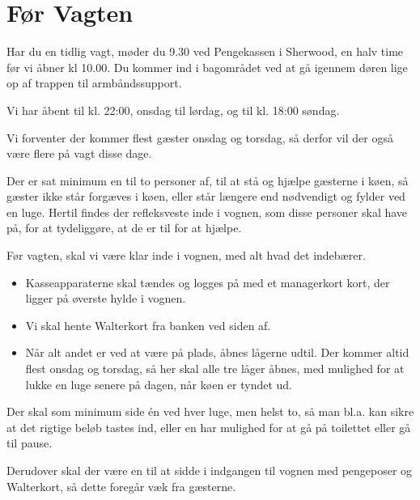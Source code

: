 \section{Før Vagten}
\label{sec:pre-vagten}

Har du en tidlig vagt, møder du 9.30 ved Pengekassen i Sherwood, en halv time før vi åbner kl 10.00.
Du kommer ind i bagområdet ved at gå igennem døren lige op af trappen til armbåndssupport.

Vi har åbent til kl. 22:00, onsdag til lørdag, og til kl. 18:00 søndag.

Vi forventer der kommer flest gæster onsdag og torsdag, 
så derfor vil der også være flere på vagt disse dage.

Der er sat minimum en til to personer af, til at stå og hjælpe gæsterne i køen, 
så gæster ikke står forgæves i køen, eller står længere end nødvendigt og fylder ved en luge.
Hertil findes der refleksveste inde i vognen, som disse personer skal have på, 
for at tydeliggøre, at de er til for at hjælpe.

Før vagten, skal vi være klar inde i vognen, med alt hvad det indebærer. 
\begin{itemize}
	\item Kasseapparaterne skal tændes og logges på med et managerkort kort, der ligger på øverste hylde i vognen.
	\item Vi skal hente Walterkort fra banken ved siden af.
	\item Når alt andet er ved at være på plads, åbnes
	lågerne udtil. Der kommer altid flest onsdag og torsdag, så her skal alle tre låger åbnes, 
	med mulighed for at lukke en luge senere på dagen, når køen er tyndet ud.
\end{itemize}

Der skal som minimum side én ved hver luge, men helst to, så man bl.a. 
kan sikre at det rigtige beløb tastes ind, 
eller en har mulighed for at gå på toilettet eller gå til pause.

Derudover skal der være en til at sidde i indgangen til vognen med pengeposer og Walterkort, 
så dette foregår væk fra gæsterne.